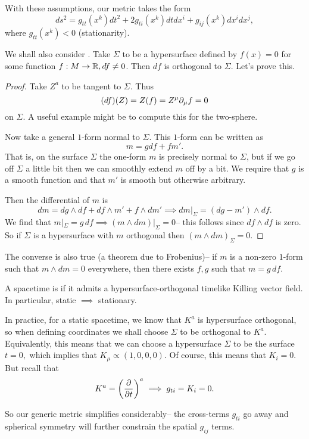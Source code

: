 With these assumptions, our metric takes the form
\begin{equation*}
    ds^2 = g_{tt}(x^k)dt^2 +2g_{ti}(x^k) dt dx^i+ g_{ij}(x^k)dx^i dx^j,
\end{equation*}
where $g_{tt}(x^k)<0$ (stationarity).

We shall also consider . Take $\Sigma$ to be a hypersurface defined by $f(x)=0$ for some function $f:M\to \RR, df\neq 0$. Then $df$ is orthogonal to $\Sigma$. Let's prove this.
\begin{proof}
Take $Z^a$ to be tangent to $\Sigma$. Thus
\begin{equation*}
    (df)(Z)=Z(f)=Z^\mu \p_\mu f = 0
\end{equation*}
on $\Sigma$. A useful example might be to compute this for the two-sphere.

Now take a general $1$-form normal to $\Sigma$. This $1$-form can be written as
\begin{equation}
    m= gdf +f m'.
\end{equation}
That is, on the surface $\Sigma$ the one-form $m$ is precisely normal to $\Sigma$, but if we go off $\Sigma$ a little bit then we can smoothly extend $m$ off by a bit. We require that $g$ is a smooth function and that $m'$ is smooth but otherwise arbitrary.

Then the differential of $m$ is
\begin{equation*}
    dm=dg\wedge df + df \wedge m' + f \wedge dm' \implies dm|_\Sigma = (dg-m') \wedge df.
\end{equation*}
We find that $m|_\Sigma= g\, df \implies (m\wedge dm)|_\Sigma =0$-- this follows since $df\wedge df$ is zero. So if $\Sigma$ is a hypersurface with $m$ orthogonal then $(m\wedge dm)_\Sigma =0$.
\end{proof}

The converse is also true (a theorem due to Frobenius)-- if $m$ is a non-zero $1$-form such that $m\wedge dm=0$ everywhere, then there exists $f,g$ such that $m=g\, df$.

\begin{defn}
    A spacetime is  if it admits a hypersurface-orthogonal timelike Killing vector field. In particular, static $\implies$ stationary.
\end{defn}

In practice, for a static spacetime, we know that $K^a$ is hypersurface orthogonal, so when defining coordinates we shall choose $\Sigma$ to be orthogonal to $K^a$. Equivalently, this means that we can choose a hypersurface $\Sigma$ to be the surface $t=0,$ which implies that $K_\mu \propto (1,0,0,0)$. Of course, this means that $K_i=0$. But recall that
\begin{equation*}
    K^a= \left(\P{}{t}\right)^a \implies g_{ti}=K_i=0.
\end{equation*}

So our generic metric simplifies considerably-- the cross-terms $g_{ti}$ go away and spherical symmetry will further constrain the spatial $g_{ij}$ terms.